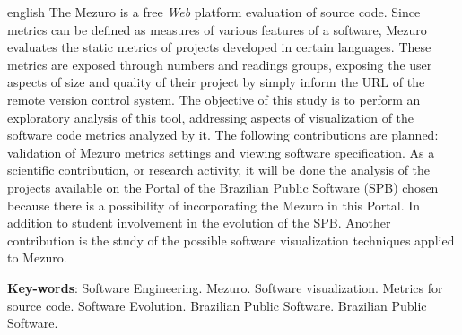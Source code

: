 \begin{resumo}[Abstract]
 \begin{otherlanguage*}{english}
   The Mezuro is a free \textit{Web} platform evaluation of source code. Since
   metrics can be defined as measures of various features of a software, Mezuro
   evaluates the static metrics of projects developed in certain languages.
   These metrics are exposed through numbers and readings groups, exposing the
   user aspects of size and quality of their project by simply inform the URL of
   the remote version control system. The objective of this study is to perform
   an exploratory analysis of this tool, addressing aspects of visualization of
   the software code metrics analyzed by it. The following contributions are
   planned:  validation of Mezuro metrics settings and viewing software
   specification. As a scientific contribution, or research activity, it will
   be done the analysis of the projects available on the Portal of the Brazilian
   Public Software (SPB) chosen because there is a possibility of incorporating
   the Mezuro in this Portal. In addition to student involvement in the
   evolution of the SPB. Another contribution is the study of the possible
   software visualization techniques applied to Mezuro.

   \vspace{\onelineskip}

   \noindent
   \textbf{Key-words}: Software Engineering. Mezuro. Software visualization.
   Metrics for source code. Software Evolution. Brazilian Public Software.
   Brazilian Public Software.
 \end{otherlanguage*}
\end{resumo}

